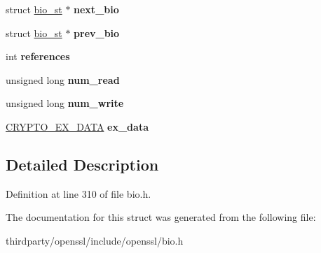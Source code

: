 \begin{DoxyCompactItemize}
struct \hyperlink{structbio__st}{bio\+\_\+st} $\ast$ {\bfseries next\+\_\+bio}
\item 
\mbox{\label{structbio__st_a86fd505e8e4af7bb98312d707ee9d170}} 
struct \hyperlink{structbio__st}{bio\+\_\+st} $\ast$ {\bfseries prev\+\_\+bio}
\item 
\mbox{\label{structbio__st_a6b72d783529f2185bb1c452ab6845d5e}} 
int {\bfseries references}
\item 
\mbox{\label{structbio__st_ab70dbdf7e557e771f49b12df73e6a91e}} 
unsigned long {\bfseries num\+\_\+read}
\item 
\mbox{\label{structbio__st_a3b884313deeabd3eb35e693394937a0e}} 
unsigned long {\bfseries num\+\_\+write}
\item 
\mbox{\label{structbio__st_a499ee1071ec22ec4da6086422785a0ca}} 
\hyperlink{structcrypto__ex__data__st}{C\+R\+Y\+P\+T\+O\+\_\+\+E\+X\+\_\+\+D\+A\+TA} {\bfseries ex\+\_\+data}
\end{DoxyCompactItemize}


\subsection{Detailed Description}


Definition at line 310 of file bio.\+h.



The documentation for this struct was generated from the following file\+:\begin{DoxyCompactItemize}
\item 
thirdparty/openssl/include/openssl/bio.\+h\end{DoxyCompactItemize}
